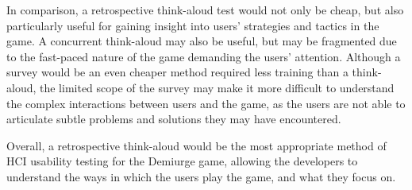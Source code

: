 \documentclass{scrartcl}
\begin{document}
In comparison, a retrospective think-aloud test would not only be cheap, but also particularly useful for gaining insight into users' strategies and tactics in the game. A concurrent think-aloud may also be useful, but may be fragmented due to the fast-paced nature of the game demanding the users' attention. \cite{dualThinkAloud} Although a survey would be an even cheaper method required less training than a think-aloud, the limited scope of the survey may make it more difficult to understand the complex interactions between users and the game, as the users are not able to articulate subtle problems and solutions they may have encountered. 

Overall, a retrospective think-aloud would be the most appropriate method of HCI usability testing for the Demiurge game, allowing the developers to understand the ways in which the users play the game, and what they focus on.



\end{document}
